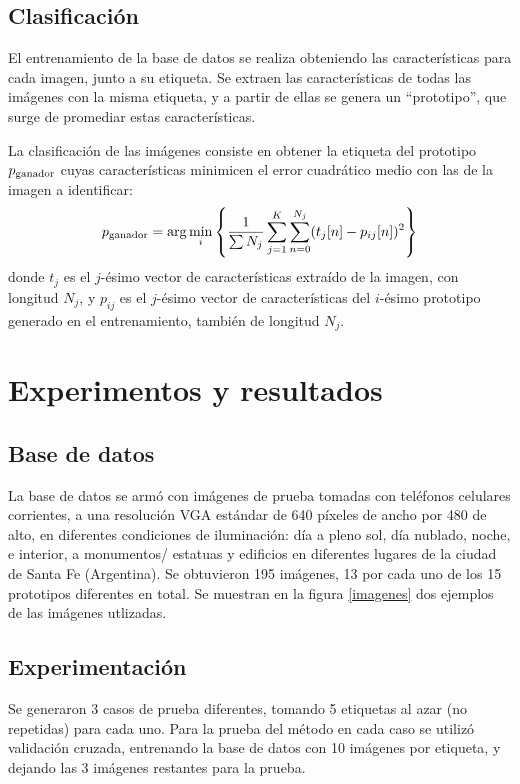 \documentclass[conference,a4paper,10pt,oneside,final]{tfmpd}
\begin{document}
\subsection{Clasificación}
El entrenamiento de la base de datos se realiza obteniendo las características
para cada imagen, junto a su etiqueta.
Se extraen las características de todas las imágenes
con la misma etiqueta, y a partir de ellas se genera un
``prototipo'', que surge de promediar estas características.

La clasificación de las imágenes consiste en
obtener la e\-ti\-que\-ta del prototipo $p_{\textrm{ganador}}$ cuyas características
minimicen el error cuadrático medio con las de la imagen a identificar:
\begin{equation}
  p_{\textrm{ganador}}=\arg \min_i\left\{ \frac{1}{\sum N_j}
                \sum_{j=1}^K\sum_{n=0}^{N_j}(t_j[n]-p_{ij}[n])^2\right\}
\end{equation}
donde $t_j$ es el $j$-ésimo vector de características extraído de la imagen, con
longitud $N_j$, y $p_{ij}$ es el $j$-ésimo vector de características del
$i$-ésimo prototipo generado en el entrenamiento, también de longitud $N_j$.
%
%
%
%
\section{Experimentos y resultados}
%
%
\subsection{Base de datos}
La base de datos se armó con imágenes de prueba tomadas con teléfonos celulares
corrientes, a una resolución VGA estándar de 640 píxeles de ancho por 480 de
alto, en diferentes condiciones
de iluminación: día a pleno sol, día nublado, noche, e interior, a monumentos/%
estatuas y edificios en diferentes lugares de la ciudad de Santa Fe (Argentina).
{Se obtuvieron 195 imágenes, 13 por cada uno de los 15 prototipos diferentes en
total.}
Se muestran en la figura \ref{imagenes} dos ejemplos de las imágenes utlizadas.
%
%
\subsection{Experimentación}
Se generaron 3 {casos} de prueba diferentes, tomando
5 etiquetas al azar (no repetidas) para cada {uno}.
Para la prueba del método {en cada caso} se utilizó validación cruzada,
entrenando la base de datos con 10 imágenes por etiqueta, y dejando las 3
imágenes restantes para la prueba.
\end{document}

